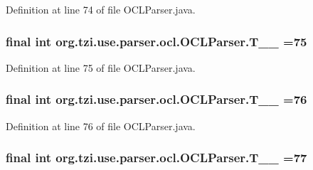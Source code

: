 Definition at line 74 of file O\-C\-L\-Parser.\-java.

\hypertarget{classorg_1_1tzi_1_1use_1_1parser_1_1ocl_1_1_o_c_l_parser_a2887cd9d0977c44d4e4169ea408bede6}{
\subsubsection[{T\-\_\-\-\_\-75}]{\setlength{\rightskip}{0pt plus 5cm}final int org.\-tzi.\-use.\-parser.\-ocl.\-O\-C\-L\-Parser.\-T\-\_\-\-\_ =75\hspace{0.3cm}{\ttfamily [static]}}}\label{classorg_1_1tzi_1_1use_1_1parser_1_1ocl_1_1_o_c_l_parser_a2887cd9d0977c44d4e4169ea408bede6}


Definition at line 75 of file O\-C\-L\-Parser.\-java.

\hypertarget{classorg_1_1tzi_1_1use_1_1parser_1_1ocl_1_1_o_c_l_parser_a2dcd2f82da46d28f072907622282d963}{
\subsubsection[{T\-\_\-\-\_\-76}]{\setlength{\rightskip}{0pt plus 5cm}final int org.\-tzi.\-use.\-parser.\-ocl.\-O\-C\-L\-Parser.\-T\-\_\-\-\_ =76\hspace{0.3cm}{\ttfamily [static]}}}\label{classorg_1_1tzi_1_1use_1_1parser_1_1ocl_1_1_o_c_l_parser_a2dcd2f82da46d28f072907622282d963}


Definition at line 76 of file O\-C\-L\-Parser.\-java.

\hypertarget{classorg_1_1tzi_1_1use_1_1parser_1_1ocl_1_1_o_c_l_parser_a7e775982b89d74ba30b3637c678f5967}{
\subsubsection[{T\-\_\-\-\_\-77}]{\setlength{\rightskip}{0pt plus 5cm}final int org.\-tzi.\-use.\-parser.\-ocl.\-O\-C\-L\-Parser.\-T\-\_\-\-\_ =77\hspace{0.3cm}{\ttfamily [static]}}}\label{classorg_1_1tzi_1_1use_1_1parser_1_1ocl_1_1_o_c_l_parser_a7e775982b89d74ba30b3637c678f5967}


